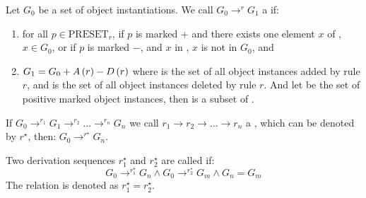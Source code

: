\begin{defi}
Let $G_0$ be a set of object instantiations. We call $G_0\rightarrow^r G_1$ a  if:
\begin{enumerate}
 \item for all $p\in\mbox{PRESET}_r$, if $p$ is marked $+$ and there exists one element $x$ of , \stTx{} $x\in G_0$, or if $p$ is marked $-$, and \faTx{} $x$ in , $x$ is not in $G_0$, and
 \item $G_1=G_0+A\left(r\right)-D\left(r\right)$ where  is the set of all object instances added by rule $r$, and  is the set of all object instances deleted by rule $r$. And let  be the set of positive marked object instances, then  is a subset of .
\end{enumerate}
If $G_0\rightarrow^{r_1}G_1\rightarrow^{r_2}\ldots\rightarrow^{r_n}G_n$ we call $r_1\rightarrow r_2\rightarrow\ldots\rightarrow r_n$ a , which can be denoted by $r^{\star}$, then: $G_0\rightarrow^{r^{\star}}G_n$.
\cite{conf/ijcai/HsuW89}
\end{defi}

\begin{defi}
Two derivation sequences $r_1^{\star}$ and $r_2^{\star}$ are called  if:
\begin{equation}
G_0\rightarrow^{r_1^{\star}}G_n\wedge G_0\rightarrow^{r_2^{\star}}G_m\wedge G_n=G_m
\end{equation}
The relation is denoted as $r_1^{\star}=r_2^{\star}$.
\cite{conf/ijcai/HsuW89}
\end{defi}